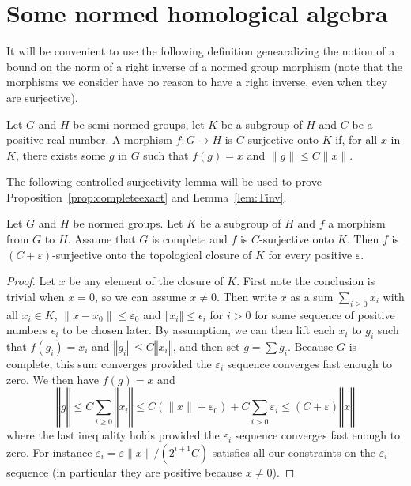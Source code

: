 \section{Some normed homological algebra}%
\label{sec:some_normed_homological_algebra}

It will be convenient to use the following definition genearalizing the notion
of a bound on the norm of a right inverse of a normed group morphism (note that
the morphisms we consider have no reason to have a right inverse, even when
they are surjective).

\begin{definition}
  \label{def:surjective_with_bound}
  Let $G$ and $H$ be semi-normed groups, let $K$ be a subgroup of $H$ and $C$ be
  a positive real number.
  A morphism $f : G → H$ is $C$-surjective onto $K$ if, for all $x$ in $K$,
  there exists some $g$ in $G$ such that $f(g) = x$ and $\|g\| ≤ C\|x\|$.
\end{definition}

The following controlled surjectivity lemma will be used to prove
Proposition~\ref{prop:completeexact} and Lemma~\ref{lem:Tinv}.

\begin{lemma}
  \label{lem:closure_surjective}
  \leanok
  Let $G$ and $H$ be normed groups. Let $K$ be a subgroup of
  $H$ and $f$ a morphism from $G$ to $H$.  Assume that $G$ is complete and
  $f$ is $C$-surjective onto $K$. Then $f$ is $(C + ε)$-surjective onto
  the topological closure of $K$ for every positive $ε$.
\end{lemma}

\begin{proof}\leanok
  Let $x$ be any element of the closure of $K$.
  First note the conclusion is trivial when $x = 0$, so we can assume
  $x ≠ 0$. Then write $x$ as a sum
  $\sum_{i \ge 0} x_i$ with all $x_i \in K$, $\|x - x_0\| ≤ ε_0$ and
  $‖x_i‖\leq \epsilon_i$ for $i>0$ for some sequence of positive numbers
  $\epsilon_i$ to be chosen later.
  By assumption, we can then lift each $x_i$ to $g_i$ such that
  $f(g_i) = x_i$ and $‖g_i‖\leq C‖x_i‖$, and then set
  $g = \sum g_i$. Because $G$ is complete,
  this sum converges provided the $ε_i$ sequence converges fast enough to zero.
  We then have $f(g) = x$ and
  \[
    ‖g‖ ≤ C\sum_{i \geq 0} ‖x_i‖ ≤
    C(\|x\| + ε_0) + C\sum_{i>0} ε_i ≤
    (C + ε)‖x‖
  \]
  where the last inequality holds provided the $ε_i$ sequence converges fast
  enough to zero. For instance $ε_i = ε∥x∥/(2^{i+1}C)$ satisfies all
  our constraints on the $ε_i$ sequence (in particular they are positive
  because $x ≠ 0$).
\end{proof}

